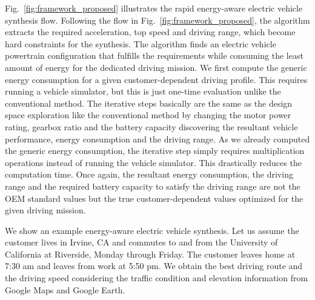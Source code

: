 \documentclass[journal]{IEEEtran}
\begin{document}
Fig.~\ref{fig:framework_proposed} illustrates the rapid energy-aware electric vehicle synthesis flow. 
Following the flow in Fig.~\ref{fig:framework_proposed}, the algorithm extracts the required acceleration, top speed and driving range, which become hard constraints for the synthesis. The algorithm finds an electric vehicle powertrain configuration that fulfills the requirements while consuming the least amount of energy for the dedicated driving mission. 
We first compute the generic energy consumption for a given customer-dependent driving profile. This requires running a vehicle simulator, but this is just one-time evaluation unlike the conventional method. The iterative steps basically are the same as the design space exploration like the conventional method by changing the motor power rating, gearbox ratio and the battery capacity discovering the resultant vehicle performance, energy consumption and the driving range. As we already computed the generic energy consumption, the iterative step simply requires multiplication operations instead of running the vehicle simulator. This drastically reduces the computation time. Once again, the resultant energy consumption, the driving range and the required battery capacity to satisfy the driving range are not the OEM standard values but the true customer-dependent values optimized for the given driving mission. 

We show an example energy-aware electric vehicle synthesis. Let us assume the customer lives in Irvine, CA and commutes to and from the University of California at Riverside, Monday through Friday. The customer leaves home at 7:30 am and leaves from work at 5:50 pm. We obtain the best driving route and the driving speed considering the traffic condition and elevation information from Google Maps and Google Earth.
\end{document}
